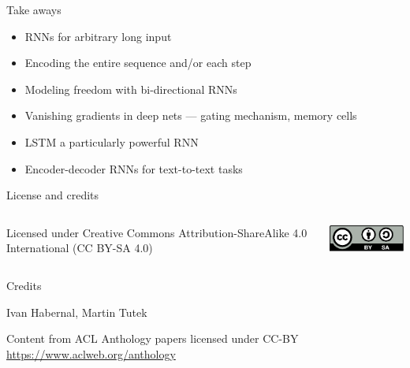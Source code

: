 \documentclass[12pt,aspectratio=169,handout]{beamer}
\begin{document}
\begin{frame}{Take aways}

\begin{itemize}
	\item RNNs for arbitrary long input
	\item Encoding the entire sequence and/or each step
	\item Modeling freedom with bi-directional RNNs
	\item Vanishing gradients in deep nets --- gating mechanism, memory cells
	\item LSTM a particularly powerful RNN
	\item Encoder-decoder RNNs for text-to-text tasks
\end{itemize}

\end{frame}



\begin{frame}{License and credits}

\begin{columns}
	\begin{column}{0.7\textwidth}
		Licensed under Creative Commons Attribution-ShareAlike 4.0 International (CC BY-SA 4.0)
	\end{column}
	\begin{column}{0.2\textwidth}
		\includegraphics[width=0.9\linewidth]{img/cc-by-sa-icon.pdf}
	\end{column}
\end{columns}

\bigskip

Credits

\begin{scriptsize}
	
	Ivan Habernal, Martin Tutek
	
	Content from ACL Anthology papers licensed under CC-BY \url{https://www.aclweb.org/anthology}
	
	
\end{scriptsize}

\end{frame}
\end{document}
